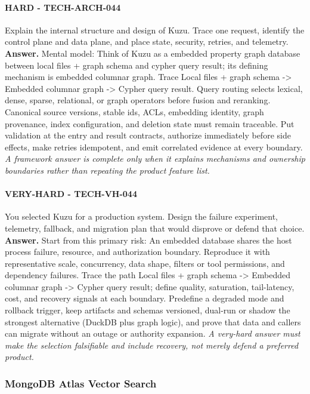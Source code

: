 \paragraph{HARD - TECH-ARCH-044} Explain the internal structure and design of Kuzu. Trace one request, identify the control plane and data plane, and place state, security, retries, and telemetry.
\textbf{Answer.} Mental model: Think of Kuzu as a embedded property graph database between local files + graph schema and cypher query result; its defining mechanism is embedded columnar graph. Trace Local files + graph schema -> Embedded columnar graph -> Cypher query result. Query routing selects lexical, dense, sparse, relational, or graph operators before fusion and reranking. Canonical source versions, stable ids, ACLs, embedding identity, graph provenance, index configuration, and deletion state must remain traceable. Put validation at the entry and result contracts, authorize immediately before side effects, make retries idempotent, and emit correlated evidence at every boundary.
\textit{A framework answer is complete only when it explains mechanisms and ownership boundaries rather than repeating the product feature list.}
\paragraph{VERY-HARD - TECH-VH-044} You selected Kuzu for a production system. Design the failure experiment, telemetry, fallback, and migration plan that would disprove or defend that choice.
\textbf{Answer.} Start from this primary risk: An embedded database shares the host process failure, resource, and authorization boundary. Reproduce it with representative scale, concurrency, data shape, filters or tool permissions, and dependency failures. Trace the path Local files + graph schema -> Embedded columnar graph -> Cypher query result; define quality, saturation, tail-latency, cost, and recovery signals at each boundary. Predefine a degraded mode and rollback trigger, keep artifacts and schemas versioned, dual-run or shadow the strongest alternative (DuckDB plus graph logic), and prove that data and callers can migrate without an outage or authority expansion.
\textit{A very-hard answer must make the selection falsifiable and include recovery, not merely defend a preferred product.}
\subsubsection*{MongoDB Atlas Vector Search}
